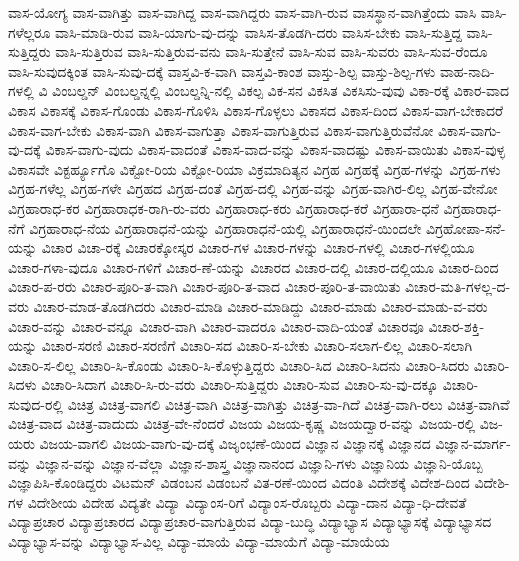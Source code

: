 {ವಾಸ-ಯೋಗ್ಯ
ವಾಸ-ವಾಗಿತ್ತು
ವಾಸ-ವಾಗಿದ್ದ
ವಾಸ-ವಾಗಿದ್ದರು
ವಾಸ-ವಾಗಿ-ರುವ
ವಾಸಸ್ಥಾನ-ವಾಗಿತ್ತೆಂದು
ವಾಸಿ
ವಾಸಿ-ಗಳೆಲ್ಲರೂ
ವಾಸಿ-ಮಾಡಿ-ರುವ
ವಾಸಿ-ಯಾಗು-ವು-ದನ್ನು
ವಾಸಿಸ-ತೊಡಗಿ-ದರು
ವಾಸಿಸ-ಬೇಕು
ವಾಸಿ-ಸುತ್ತಿದ್ದ
ವಾಸಿ-ಸುತ್ತಿದ್ದರು
ವಾಸಿ-ಸುತ್ತಿರುವ
ವಾಸಿ-ಸುತ್ತಿರುವ-ವನು
ವಾಸಿ-ಸುತ್ತೇನೆ
ವಾಸಿ-ಸುವ
ವಾಸಿ-ಸುವರು
ವಾಸಿ-ಸುವ-ರೆಂದೂ
ವಾಸಿ-ಸುವುದಕ್ಕಿಂತ
ವಾಸಿ-ಸುವು-ದಕ್ಕೆ
ವಾಸ್ತವಿ-ಕ-ವಾಗಿ
ವಾಸ್ತವಿ-ಕಾಂಶ
ವಾಸ್ತು-ಶಿಲ್ಪ
ವಾಸ್ತು-ಶಿಲ್ಪ-ಗಳು
ವಾಹ-ನಾದಿ-ಗಳಲ್ಲಿ
ವಿ
ವಿಂಬಲ್ಡನ್
ವಿಂಬಲ್ಡನ್ನಲ್ಲಿ
ವಿಂಬಲ್ಡನ್ನಿ-ನಲ್ಲಿ
ವಿಕಲ್ಪ
ವಿಕ-ಸನ
ವಿಕಸಿತ
ವಿಕಸಿಸು-ವುವು
ವಿಕಾ-ರಕ್ಕೆ
ವಿಕಾರ-ವಾದ
ವಿಕಾಸ
ವಿಕಾಸಕ್ಕೆ
ವಿಕಾಸ-ಗೊಂಡು
ವಿಕಾಸ-ಗೊಳಿಸಿ
ವಿಕಾಸ-ಗೊಳ್ಳಲು
ವಿಕಾಸದ
ವಿಕಾಸ-ದಿಂದ
ವಿಕಾಸ-ವಾಗ-ಬೇಕಾದರೆ
ವಿಕಾಸ-ವಾಗ-ಬೇಕು
ವಿಕಾಸ-ವಾಗಿ
ವಿಕಾಸ-ವಾಗುತ್ತಾ
ವಿಕಾಸ-ವಾಗುತ್ತಿರುವ
ವಿಕಾಸ-ವಾಗುತ್ತಿರುವೆನೋ
ವಿಕಾಸ-ವಾಗು-ವು-ದಕ್ಕೆ
ವಿಕಾಸ-ವಾಗು-ವುದು
ವಿಕಾಸ-ವಾದಂತೆ
ವಿಕಾಸ-ವಾದ-ವನ್ನು
ವಿಕಾಸ-ವಾದಷ್ಟು
ವಿಕಾಸ-ವಾಯಿತು
ವಿಕಾಸ-ವುಳ್ಳ
ವಿಕಾಸವೇ
ವಿಕ್ಟರ್ಹ್ಯೂಗೊ
ವಿಕ್ಟೋ-ರಿಯ
ವಿಕ್ಟೋ-ರಿಯಾ
ವಿಕ್ರಮಾದಿತ್ಯನ
ವಿಗ್ರಹ
ವಿಗ್ರಹಕ್ಕೆ
ವಿಗ್ರಹ-ಗಳನ್ನು
ವಿಗ್ರಹ-ಗಳು
ವಿಗ್ರಹ-ಗಳೆಲ್ಲ
ವಿಗ್ರಹ-ಗಳೇ
ವಿಗ್ರಹದ
ವಿಗ್ರಹ-ದಂತೆ
ವಿಗ್ರಹ-ದಲ್ಲಿ
ವಿಗ್ರಹ-ವನ್ನು
ವಿಗ್ರಹ-ವಾಗಿರ-ಲಿಲ್ಲ
ವಿಗ್ರಹ-ವೇನೋ
ವಿಗ್ರಹಾರಾಧ-ಕರ
ವಿಗ್ರಹಾರಾಧಕ-ರಾಗಿ-ರು-ವರು
ವಿಗ್ರಹಾರಾಧ-ಕರು
ವಿಗ್ರಹಾರಾಧ-ಕರೆ
ವಿಗ್ರಹಾರಾ-ಧನೆ
ವಿಗ್ರಹಾರಾಧ-ನೆಗೆ
ವಿಗ್ರಹಾರಾಧ-ನೆಯ
ವಿಗ್ರಹಾರಾಧನೆ-ಯನ್ನು
ವಿಗ್ರಹಾರಾಧನೆ-ಯಲ್ಲಿ
ವಿಗ್ರಹಾರಾಧನೆ-ಯಿಂದಲೇ
ವಿಗ್ರಹೋಪಾ-ಸನೆ-ಯನ್ನು
ವಿಚಾರ
ವಿಚಾ-ರಕ್ಕೆ
ವಿಚಾರಕ್ಕೋಸ್ಕರ
ವಿಚಾರ-ಗಳ
ವಿಚಾರ-ಗಳನ್ನು
ವಿಚಾರ-ಗಳಲ್ಲಿ
ವಿಚಾರ-ಗಳಲ್ಲಿಯೂ
ವಿಚಾರ-ಗಳಾ-ವುದೂ
ವಿಚಾರ-ಗಳಿಗೆ
ವಿಚಾರ-ಣೆ-ಯನ್ನು
ವಿಚಾರದ
ವಿಚಾರ-ದಲ್ಲಿ
ವಿಚಾರ-ದಲ್ಲಿಯೂ
ವಿಚಾರ-ದಿಂದ
ವಿಚಾರ-ಪ-ರರು
ವಿಚಾರ-ಪೂರಿ-ತ-ವಾಗಿ
ವಿಚಾರ-ಪೂರಿ-ತ-ವಾದ
ವಿಚಾರ-ಪೂರಿ-ತ-ವಾಯಿತು
ವಿಚಾರ-ಮತಿ-ಗಳಲ್ಲ-ದ-ವರು
ವಿಚಾರ-ಮಾಡ-ತೊಡಗಿದರು
ವಿಚಾರ-ಮಾಡಿ
ವಿಚಾರ-ಮಾಡಿದ್ದು
ವಿಚಾರ-ಮಾಡು
ವಿಚಾರ-ಮಾಡು-ವ-ವರು
ವಿಚಾರ-ವನ್ನು
ವಿಚಾರ-ವನ್ನೂ
ವಿಚಾರ-ವಾಗಿ
ವಿಚಾರ-ವಾದರೂ
ವಿಚಾರ-ವಾದಿ-ಯಂತೆ
ವಿಚಾರವೂ
ವಿಚಾರ-ಶಕ್ತಿ-ಯನ್ನು
ವಿಚಾರ-ಸರಣಿ
ವಿಚಾರ-ಸರಣಿಗೆ
ವಿಚಾರಿ-ಸದ
ವಿಚಾರಿ-ಸ-ಬೇಕು
ವಿಚಾರಿ-ಸಲಾಗ-ಲಿಲ್ಲ
ವಿಚಾರಿ-ಸಲಾಗಿ
ವಿಚಾರಿ-ಸ-ಲಿಲ್ಲ
ವಿಚಾರಿ-ಸಿ-ಕೊಂಡು
ವಿಚಾರಿ-ಸಿ-ಕೊಳ್ಳುತ್ತಿದ್ದರು
ವಿಚಾರಿ-ಸಿದ
ವಿಚಾರಿ-ಸಿದನು
ವಿಚಾರಿ-ಸಿದರು
ವಿಚಾರಿ-ಸಿದಳು
ವಿಚಾರಿ-ಸಿದಾಗ
ವಿಚಾರಿ-ಸಿ-ರು-ವರು
ವಿಚಾರಿ-ಸುತ್ತಿದ್ದರು
ವಿಚಾರಿ-ಸುವ
ವಿಚಾರಿ-ಸು-ವು-ದಕ್ಕೂ
ವಿಚಾರಿ-ಸುವುದ-ರಲ್ಲಿ
ವಿಚಿತ್ರ
ವಿಚಿತ್ರ-ವಾಗಲಿ
ವಿಚಿತ್ರ-ವಾಗಿ
ವಿಚಿತ್ರ-ವಾಗಿತ್ತು
ವಿಚಿತ್ರ-ವಾ-ಗಿದೆ
ವಿಚಿತ್ರ-ವಾಗಿ-ರಲು
ವಿಚಿತ್ರ-ವಾಗಿವೆ
ವಿಚಿತ್ರ-ವಾದ
ವಿಚಿತ್ರ-ವಾದುದು
ವಿಚಿತ್ರ-ವೇ-ನೆಂದರೆ
ವಿಜಯ
ವಿಜಯ-ಕೃಷ್ಣ
ವಿಜಯದ್ವಾರ-ವನ್ನು
ವಿಜಯ-ರಲ್ಲಿ
ವಿಜ-ಯರು
ವಿಜಯ-ವಾಗಲಿ
ವಿಜಯ-ವಾಗು-ವು-ದಕ್ಕೆ
ವಿಜೃಂಭಣೆ-ಯಿಂದ
ವಿಜ್ಞಾನ
ವಿಜ್ಞಾನಕ್ಕೆ
ವಿಜ್ಞಾನದ
ವಿಜ್ಞಾನ-ಮಾರ್ಗ-ವನ್ನು
ವಿಜ್ಞಾನ-ವನ್ನು
ವಿಜ್ಞಾನ-ವೆಲ್ಲಾ
ವಿಜ್ಞಾನ-ಶಾಸ್ತ್ರ
ವಿಜ್ಞಾನಾನಂದ
ವಿಜ್ಞಾನಿ-ಗಳು
ವಿಜ್ಞಾನಿಯ
ವಿಜ್ಞಾನಿ-ಯೊಬ್ಬ
ವಿಜ್ಞಾಪಿಸಿ-ಕೊಂಡಿದ್ದರು
ವಿಟಮನ್
ವಿಡಂಬನ
ವಿಡಂಬನೆ
ವಿತ-ರಣೆ-ಯಿಂದ
ವಿದಂತಿ
ವಿದೇಶಕ್ಕೆ
ವಿದೇಶ-ದಿಂದ
ವಿದೇಶಿ-ಗಳ
ವಿದೇಶೀಯ
ವಿದೇಹ
ವಿದ್ಯತೇ
ವಿದ್ಯಾ
ವಿದ್ಯಾಂಸ-ರಿಗೆ
ವಿದ್ಯಾಂಸ-ರೊಬ್ಬರು
ವಿದ್ಯಾ-ದಾನ
ವಿದ್ಯಾ-ಧಿ-ದೇವತೆ
ವಿದ್ಯಾಪ್ರಚಾರ
ವಿದ್ಯಾಪ್ರಚಾರದ
ವಿದ್ಯಾಪ್ರಚಾರ-ವಾಗುತ್ತಿರುವ
ವಿದ್ಯಾ-ಬುದ್ಧಿ
ವಿದ್ಯಾಭ್ಯಾಸ
ವಿದ್ಯಾಭ್ಯಾಸಕ್ಕೆ
ವಿದ್ಯಾಭ್ಯಾಸದ
ವಿದ್ಯಾಭ್ಯಾಸ-ವನ್ನು
ವಿದ್ಯಾಭ್ಯಾಸ-ವಿಲ್ಲ
ವಿದ್ಯಾ-ಮಾಯೆ
ವಿದ್ಯಾ-ಮಾಯೆಗೆ
ವಿದ್ಯಾ-ಮಾಯೆಯ
}
